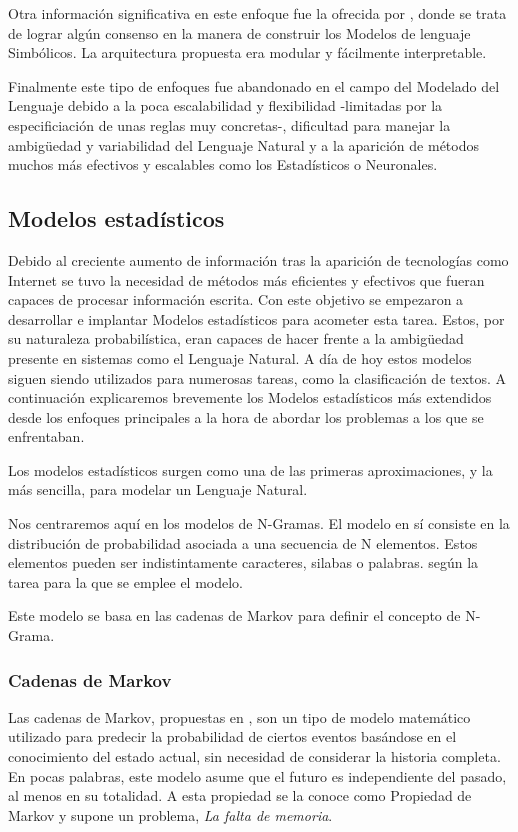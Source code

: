 Otra información significativa en este enfoque fue la ofrecida por \cite{reiter1997building}, donde se trata de lograr algún consenso en la manera de construir los Modelos de lenguaje Simbólicos.
La arquitectura propuesta era modular y fácilmente interpretable.

Finalmente este tipo de enfoques fue abandonado en el campo del Modelado del Lenguaje debido a la poca escalabilidad y flexibilidad -limitadas por la especificiación de unas reglas muy concretas-, dificultad para manejar la ambigüedad y variabilidad del Lenguaje Natural y a la aparición de métodos muchos más efectivos y escalables como los Estadísticos o Neuronales.

\subsection{Modelos estadísticos}

Debido al creciente aumento de información tras la aparición de tecnologías como Internet se tuvo la necesidad de métodos más eficientes y efectivos que fueran capaces de procesar información escrita. Con este objetivo se empezaron a desarrollar e implantar Modelos estadísticos para acometer esta tarea. Estos, por su naturaleza probabilística, eran capaces de hacer frente a la ambigüedad presente en sistemas como el Lenguaje Natural. A día de hoy estos modelos siguen siendo utilizados para numerosas tareas, como la clasificación de textos. A continuación explicaremos brevemente los Modelos estadísticos más extendidos desde los enfoques principales a la hora de abordar los problemas a los que se enfrentaban.

Los modelos estadísticos surgen como una de las primeras aproximaciones, y la más sencilla, para modelar un Lenguaje Natural.

Nos centraremos aquí en los modelos de N-Gramas. El modelo en sí consiste en la distribución de probabilidad asociada a una secuencia de N elementos. Estos elementos pueden ser indistintamente caracteres, silabas o palabras. según la tarea para la que se emplee el modelo.

Este modelo se basa en las cadenas de Markov para definir el concepto de N-Grama.

\subsubsection{Cadenas de Markov}

Las cadenas de Markov, propuestas en \cite{markov1906rasprostranenie}, son un tipo de modelo matemático utilizado para predecir la probabilidad de ciertos eventos basándose en el conocimiento del estado actual, sin necesidad de considerar la historia completa. En pocas palabras, este modelo asume que el futuro es independiente del pasado, al menos en su totalidad. A esta propiedad se la conoce como Propiedad de Markov y supone un problema, \textit{La falta de memoria}.

